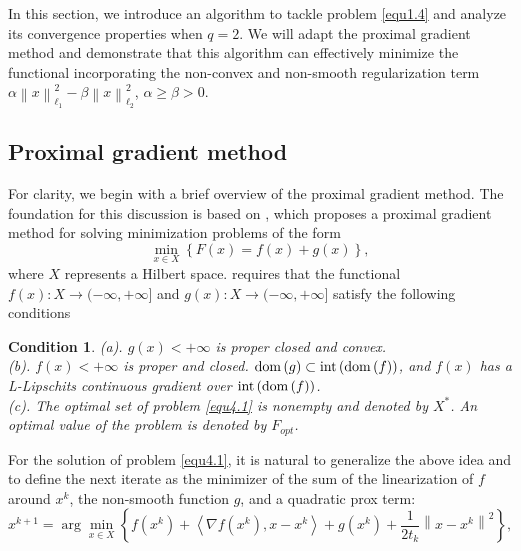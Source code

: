 \documentclass[a4paper,12pt]{article}
\newtheorem{condition}[theorem]{Condition}
\numberwithin{equation}{section}
\begin{document}
\par In this section, we introduce an algorithm to tackle problem \eqref{equ1.4} and analyze its convergence properties when $q=2$. We will adapt the proximal gradient method \cite{BA17} and demonstrate that this algorithm can effectively minimize the functional incorporating the non-convex and non-smooth regularization term $\alpha\left\|x\right\|_{\ell_{1}}^{2}-\beta\left\|x\right\|_{\ell_{2}}^{2}$, $\alpha\geq\beta> 0$.

\subsection{Proximal gradient method}\label{sec4.1}

For clarity, we begin with a brief overview of the proximal gradient method. The foundation for this discussion is based on \cite[Chapter 10]{BA17}, which proposes a proximal gradient method for solving minimization problems of the form
\begin{equation}\label{equ4.1}
    \min_{x\in X}\left\{F\left(x\right)= f\left(x\right)+g\left(x\right)\right\},
\end{equation}
where $X$ represents a Hilbert space. \cite[Assumption 10.1]{BA17} requires that the functional $f\left(x\right): X\rightarrow (-\infty,+\infty]$ and $g\left(x\right): X\rightarrow (-\infty,+\infty]$ satisfy the following conditions
\begin{condition}\label{con4.1}
    (a). $g\left(x\right)<+\infty$ is proper closed and convex. \\
    (b). $f\left(x\right)<+\infty$ is proper and closed. ${\rm dom}\left(g\right)\subset {\rm int}\left({\rm dom}\left(f\right)\right)$, and $f\left(x\right)$ has a L-Lipschits continuous gradient over ${\rm int}\left({\rm dom}\left(f\right)\right)$.\\
    (c). The optimal set of problem \eqref{equ4.1} is nonempty and denoted by $X^{*}$. An optimal value of the problem is denoted by $F_{opt}$.
\end{condition}
\par For the solution of problem \eqref{equ4.1}, it is natural to generalize the above idea and to define the next iterate as the minimizer of the sum of the linearization of $f$ around $x^k$, the non-smooth function $g$, and a quadratic prox term:
\begin{equation}\label{equ4.2}
    x^{k+1}=\arg\min_{x\in X}\left\{f\left(x^{k}\right)+\left<\nabla f\left(x^{k}\right), x-x^{k}\right>+g\left(x^{k}\right)+\frac{1}{2t_{k}}\left\|x-x^{k}\right\|^{2}\right\},
\end{equation}
\end{document}
